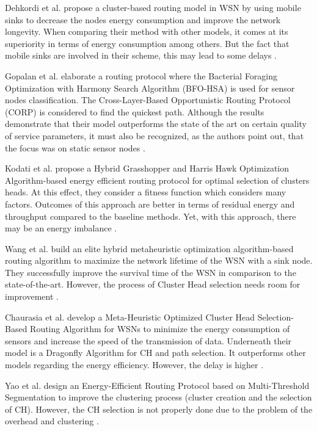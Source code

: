 Dehkordi et al. \cite{ghorbani_dehkordi_cluster_2023} propose a cluster-based routing model in WSN by using mobile sinks to decrease the nodes energy consumption and improve the network longevity. When comparing their method with other models, it comes at its superiority in terms of energy consumption among others. But the fact that mobile sinks are involved in their scheme, this may lead to some delays \cite{senkumar_enhanced_2024}. 

Gopalan et al. \cite{harihara_gopalan_energy_2024} elaborate a routing protocol where the Bacterial Foraging Optimization with Harmony Search Algorithm (BFO-HSA) is used for sensor nodes classification. The Cross-Layer-Based Opportunistic Routing Protocol (CORP) is considered to find the quickest path. Although the results demonstrate that their model outperforms the state of the art on certain quality of service parameters, it must also be recognized, as the authors point out, that the focus was on static sensor nodes \cite{harihara_gopalan_energy_2024}. 

Kodati et al. \cite{kodati_hybrid_2024} propose a Hybrid Grasshopper and Harris Hawk Optimization Algorithm-based energy efficient routing protocol for optimal selection of clusters heads. At this effect, they consider a fitness function which considers many factors. Outcomes of this approach are better in terms of residual energy and throughput compared to the baseline methods. Yet, with this approach, there may be an energy imbalance \cite{kodati_hybrid_2024}.

Wang et al. \cite{wang_elite_2020} build an elite hybrid metaheuristic optimization algorithm-based routing algorithm to maximize the network lifetime of the WSN with a sink node. They successfully improve the survival time of the WSN in comparison to the state-of-the-art. However, the process of Cluster Head selection needs room for improvement \cite{kodati_hybrid_2024}. 

Chaurasia et al. develop \cite{chaurasia_mocraw_2023} a Meta-Heuristic Optimized Cluster Head Selection-Based Routing Algorithm for WSNs to minimize the energy consumption of sensors and increase the speed of the transmission of data. Underneath their model is a Dragonfly Algorithm for CH and path selection. It outperforms other models regarding the energy efficiency. However, the delay is higher \cite{wilson_optimizing_2024}. 

Yao et al. \cite{yao_energy-efficient_2022} design an Energy-Efficient Routing Protocol based on Multi-Threshold Segmentation to improve the clustering process (cluster creation and the selection of CH). However, the CH selection is not properly done due to the problem of the overhead and clustering \cite{rao_optimized_2024}. 

